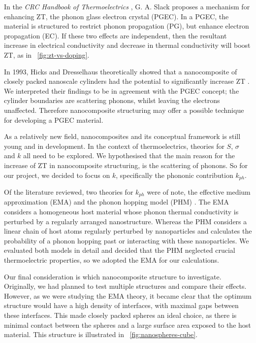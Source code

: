 \documentclass[12pt,draft]{article}
\newcommand{\figref}[2][\figurename~]{#1\ref{#2}}
\begin{document}
In the \emph{CRC Handbook of Thermoelectrics} \cite{crc-handbook}, G. A. Slack proposes a mechanism for enhancing ZT, the phonon glass electron crystal (PGEC). In a PGEC, the material is structured to restrict phonon propagation (PG), but enhance electron propagation (EC). If these two effects are independent, then the resultant increase in electrical conductivity and decrease in thermal conductivity will boost ZT, as in \figref{fig:zt-vs-doping}.

In 1993, Hicks and Dresselhaus theoretically showed that a nanocomposite of closely packed nanoscale cylinders had the potential to significantly increase ZT \cite{nanowires}. We interpreted their findings to be in agreement with the PGEC concept; the cylinder boundaries are scattering phonons, whilst leaving the electrons unaffected. Therefore nanocomposite structuring may offer a possible technique for developing a PGEC material.

As a relatively new field, nanocomposites and its conceptual framework is still young and in development. In the context of thermoelectrics, theories for $S$, $\sigma$ and $k$ all need to be explored. We hypothesised that the main reason for the increase of ZT in nanocomposite structuring, is the scattering of phonons. So for our project, we decided to focus on $k$, specifically the phononic contribution $k_{ph}$. 

Of the literature reviewed, two theories for $k_{ph}$ were of note, the effective medium approximation (EMA) \cite{ema} and the phonon hopping model (PHM) \cite{phm}. The EMA considers a homogeneous host material whose phonon thermal conductivity is perturbed by a regularly arranged nanostructure. Whereas the PHM considers a linear chain of host atoms regularly perturbed by nanoparticles and calculates the probability of a phonon hopping past or interacting with these nanoparticles. We evaluated both models in detail and decided that the PHM neglected crucial thermoelectric properties, so we adopted the EMA for our calculations.

Our final consideration is which nanocomposite structure to investigate. Originally, we had planned to test multiple structures and compare their effects. However, as we were studying the EMA theory, it became clear that the optimum structure would have a high density of interfaces, with maximal gaps between these interfaces. This made closely packed spheres an ideal choice, as there is minimal contact between the spheres and a large surface area exposed to the host material. This structure is illustrated in \figref{fig:nanospheres-cube}.
\end{document}
